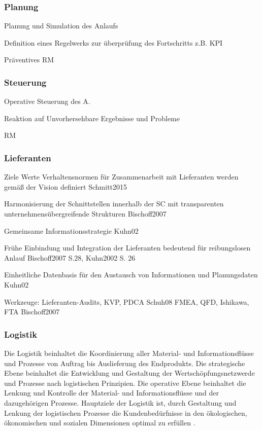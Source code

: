 \subsubsection*{Planung}

Planung und Simulation des Anlaufs

Definition eines Regelwerks zur überprüfung des Fortschritts z.B. KPI

Präventives RM

\subsubsection*{Steuerung}

Operative Steuerung des A.

Reaktion auf Unvorhersehbare Ergebnisse und Probleme

RM


\subsubsection*{Lieferanten}

Ziele Werte Verhaltensnormen für Zusammenarbeit mit Lieferanten werden gemäß der Vision definiert Schmitt2015

Harmonisierung der Schnittstellen innerhalb der SC mit transparenten unternehmensübergreifende Strukturen Bischoff2007

Gemeinsame Informationsstrategie  Kuhn02

Frühe Einbindung und Integration der Lieferanten bedeutend für reibungslosen Anlauf Bischoff2007 S.28, Kuhn2002 S. 26

Einheitliche Datenbasis für den Austausch von Informationen und Planungsdaten Kuhn02

Werkzeuge: 
  Lieferanten-Audits, KVP, PDCA Schuh08
  FMEA, QFD, Ishikawa, FTA Bischoff2007

\subsubsection*{Logistik}

Die Logistik beinhaltet die Koordinierung aller Material- und Informationsflüsse und Prozesse von Auftrag bis Auslieferung des Endprodukts. Die strategische Ebene beinhaltet die Entwicklung und Gestaltung der Wertschöpfungsnetzwerde und Prozesse nach logistischen Prinzipien. Die operative Ebene beinhaltet die Lenkung und Kontrolle der Material- und Informationsflüsse und der dazugehörigen Prozesse. 
Hauptziele der Logistik ist, durch Gestaltung und Lenkung der logistischen Prozesse die Kundenbedürfnisse in den ökologischen, ökonomischen und sozialen Dimensionen optimal zu erfüllen \cite[28]{Schmitt2015}. 

